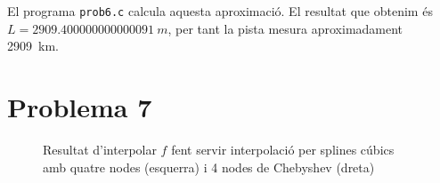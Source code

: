 \documentclass[12pt]{article}
\numberwithin{table}{section}
\numberwithin{figure}{section}
\numberwithin{equation}{section}
\begin{document}
El programa \texttt{prob6.c} calcula aquesta aproximació. El resultat que obtenim és \( L = \SI{2909.400000000000091}{m} \), per tant la pista mesura aproximadament \SI{2909}{km}.

\newpage
\section{Problema 7}
\begin{figure}[htb]
	\centering
	\sffamily \footnotesize
	
	\caption{Resultat d'interpolar \( f \) fent servir interpolació per splines cúbics amb quatre nodes (esquerra) i 4 nodes de Chebyshev (dreta)}
	\label{fig:splines}	
\end{figure}
\end{document}
